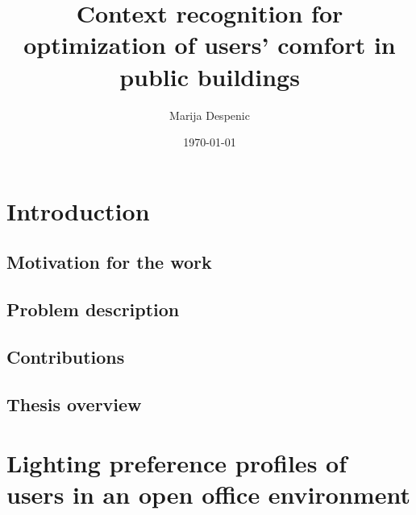 \documentclass[a4paper]{article}
\title{\textbf{Context recognition for optimization of users' comfort in public buildings}}
\author{Marija Despenic}
\date{\today}
\begin{document}
\maketitle

\newpage

\tableofcontents
\newpage


\section {Introduction}

\subsection {Motivation for the work}		

\subsection {Problem description}

\subsection{Contributions}

\subsection{Thesis overview}

\section{Lighting preference profiles of users in an open office environment}\label{sec:PrefProfiles}
\end{document}
